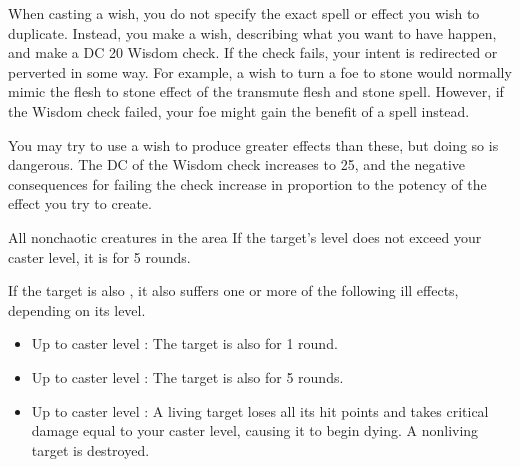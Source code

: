 \par When casting a wish, you do not specify the exact spell or effect you wish to duplicate. Instead, you make a wish, describing what you want to have happen, and make a DC 20 Wisdom check. If the check fails, your intent is redirected or perverted in some way. For example, a wish to turn a foe to stone would normally mimic the flesh to stone effect of the transmute flesh and stone spell. However, if the Wisdom check failed, your foe might gain the benefit of a  spell instead.
\par You may try to use a wish to produce greater effects than these, but doing so is dangerous. The DC of the Wisdom check increases to 25, and the negative consequences for failing the check increase in proportion to the potency of the effect you try to create.

\begin{spellheader}
\end{spellheader}
\begin{spelleffects}
    \begin{spelltargets}{All nonchaotic creatures in the area}
        \spelleffect If the target's level does not exceed your caster level, it is \bewildered for 5 rounds.

        If the target is also \bloodied, it also suffers one or more of the following ill effects, depending on its level.
        \begin{itemize}
            \item Up to caster level : The target is also \confused for 1 round.
            \item Up to caster level : The target is also \paralyzed for 5 rounds.
            \item Up to caster level : A living target loses all its hit points and takes critical damage equal to your caster level, causing it to begin dying. A nonliving target is destroyed.
        \end{itemize}
    \end{spelltargets}
\end{spelleffects}
\begin{spellfooter}
    
\end{spellfooter}

